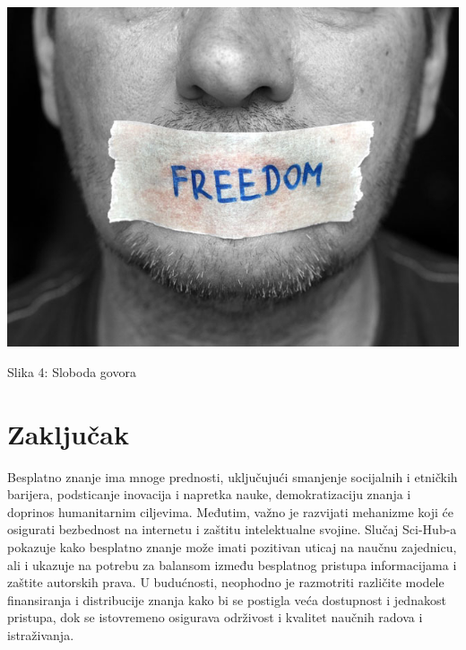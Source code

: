 \documentclass[a4paper]{article}
\begin{document}
{\begin{center}
\includegraphics[scale=0.35]{sloboda_govora.jpg}
\end{center}
\caption{Slika 4: Sloboda govora}
\label{Sloboda govora}


\setlength{\parskip}{2em}


\setlength{\parskip}{1em}

\section{Zaključak}
\label{Zaključak}

Besplatno znanje ima mnoge prednosti, uključujući smanjenje socijalnih i etničkih barijera, podsticanje inovacija i napretka nauke, demokratizaciju znanja i doprinos humanitarnim ciljevima. Međutim, važno je razvijati mehanizme koji će osigurati bezbednost na internetu i zaštitu intelektualne svojine. Slučaj Sci-Hub-a pokazuje kako besplatno znanje može imati pozitivan uticaj na naučnu zajednicu, ali i ukazuje na potrebu za balansom između besplatnog pristupa informacijama i zaštite autorskih prava. U budućnosti, neophodno je razmotriti različite modele finansiranja i distribucije znanja kako bi se postigla veća dostupnost i jednakost pristupa, dok se istovremeno osigurava održivost i kvalitet naučnih radova i istraživanja.

\setlength{\parskip}{27em}




\appendix

}
\end{document}
